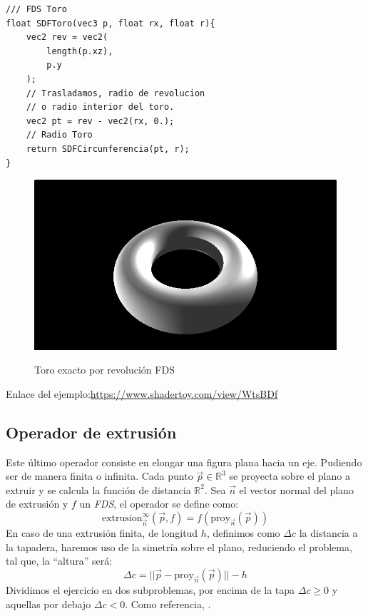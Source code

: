 \begin{lstlisting}
/// FDS Toro
float SDFToro(vec3 p, float rx, float r){   
    vec2 rev = vec2(
        length(p.xz), 
        p.y
    );
    // Trasladamos, radio de revolucion
    // o radio interior del toro.
    vec2 pt = rev - vec2(rx, 0.);
    // Radio Toro
    return SDFCircunferencia(pt, r);
}
\end{lstlisting}

\begin{figure}[H]
  \centering
  \captionsetup{justification=centering}%
  \includegraphics[width=1.0\textwidth]{secciones/imagenes/sdf/3d/sdf_toro.png}\label{fig:torus}
  \caption{Toro exacto por revolución FDS}
\end{figure}

Enlace del ejemplo:\url{https://www.shadertoy.com/view/WtsBDf}

\subsection{Operador de extrusión}
Este último operador consiste en elongar una figura plana hacia un eje. Pudiendo ser de manera finita o infinita. Cada punto \(\Vec{p}\in\mathbb{R}^3\) se proyecta sobre el plano a extruir y se calcula la función de distancia \(\mathbb{R}^2\). Sea \(\Vec{n}\) el  vector normal del plano de extrusión y \(f\) un \textit{FDS}, el operador se define como:
\[\text{extrusion}^\infty_{\Vec{n}}\left(\Vec{p},f\right) = f\left(\text{proy}_{\Vec{n}}(\Vec{p})\right)\]
En caso de una extrusión finita, de longitud \(h\), definimos como \(\Delta c\) la distancia a la tapadera, haremos uso de la simetría sobre el plano, reduciendo el problema, tal que, la \enquote{altura} será:
\[\Delta c  =\vert\vert \Vec{p} - \text{proy}_{\Vec{n}}(\Vec{p}) \vert\vert - h\]
Dividimos el ejercicio en dos subproblemas, por encima de la tapa \(\Delta c \ge 0\) y aquellas por debajo \(\Delta c < 0\). Como referencia, .

